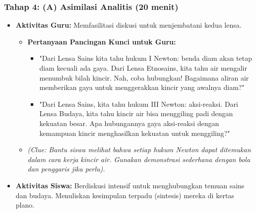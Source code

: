 \documentclass[a4paper,12pt]{article}
\begin{document}
\subsubsection{Tahap 4: (A) Asimilasi Analitis (20 menit)}
\begin{itemize}
\item \textbf{Aktivitas Guru:} Memfasilitasi diskusi untuk menjembatani kedua lensa.
    \begin{itemize}
    \item \textbf{Pertanyaan Pancingan Kunci untuk Guru:}
        \begin{itemize}
        \item "Dari Lensa Sains kita tahu hukum I Newton: benda diam akan tetap diam kecuali ada gaya. Dari Lensa Etnosains, kita tahu air mengalir menumbuk bilah kincir. Nah, coba hubungkan! Bagaimana aliran air memberikan gaya untuk menggerakkan kincir yang awalnya diam?"
        \item "Dari Lensa Sains, kita tahu hukum III Newton: aksi-reaksi. Dari Lensa Budaya, kita tahu kincir air bisa menggiling padi dengan kekuatan besar. Apa hubungannya gaya aksi-reaksi dengan kemampuan kincir menghasilkan kekuatan untuk menggiling?"
        \end{itemize}
    \item \textit{(Clue: Bantu siswa melihat bahwa setiap hukum Newton dapat ditemukan dalam cara kerja kincir air. Gunakan demonstrasi sederhana dengan bola dan penggaris jika perlu).}
    \end{itemize}
\item \textbf{Aktivitas Siswa:} Berdiskusi intensif untuk menghubungkan temuan sains dan budaya. Menuliskan kesimpulan terpadu (sintesis) mereka di kertas plano.
\end{itemize}
\end{document}
